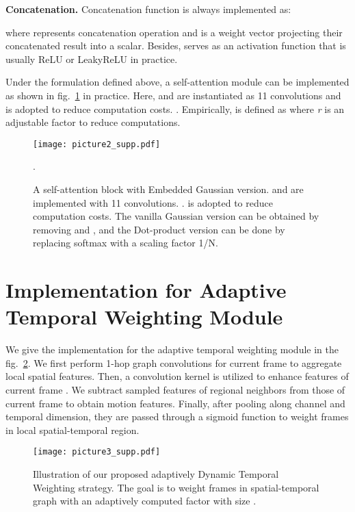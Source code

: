 \documentclass[runningheads]{llncs}
\begin{document}
\textbf{Concatenation.} Concatenation function is always implemented as:

where  represents concatenation operation and  is a weight vector projecting their concatenated result into a scalar. Besides,  serves as an activation function that is usually ReLU or LeakyReLU in practice.

Under the formulation defined above, a self-attention module can be implemented as shown in fig.~\ref{fig2} in practice. Here,  and  are instantiated as 11 convolutions and  is adopted to reduce computation costs. . Empirically,  is defined as  where \textit{r} is an adjustable factor to reduce computations.

\begin{figure}[t]
    \centering
    \texttt{[image: picture2\_supp.pdf]} \caption{A self-attention block with Embedded Gaussian version.  and  are implemented with 11 convolutions. .  is adopted to reduce computation costs. The vanilla Gaussian version can be obtained by removing  and , and the Dot-product version can be done by replacing softmax with a scaling factor 1/N. }.
    \label{fig2}
\end{figure}

\section{Implementation for Adaptive Temporal Weighting Module}
We give the implementation for the adaptive temporal weighting module in the fig.~\ref{fig3}. We first perform 1-hop graph convolutions for current frame  to aggregate local spatial features. Then, a  convolution kernel is utilized to enhance features of current frame . We subtract sampled features of regional neighbors from those of current frame to obtain motion features. Finally, after pooling along channel and temporal dimension, they are passed through a sigmoid function to weight frames in local spatial-temporal region.
\begin{figure}[h]
    \centering
    \texttt{[image: picture3\_supp.pdf]} \caption{ Illustration of our proposed adaptively Dynamic Temporal Weighting strategy. The goal is to weight frames in spatial-temporal graph with an adaptively computed factor with size .}
    \label{fig3}
\end{figure}
\end{document}
